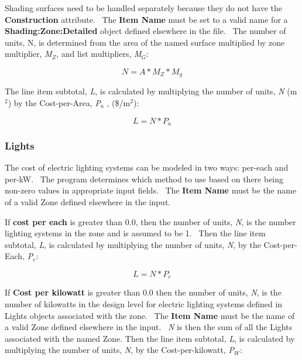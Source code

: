 Shading surfaces need to be handled separately because they do not have the \textbf{Construction} attribute.~ The \textbf{Item Name} must be set to a valid name for a \textbf{Shading:Zone:Detailed} object defined elsewhere in the file.~ The number of units, N, is determined from the area of the named surface multiplied by zone multiplier, \emph{M\(_{Z}\)}, and list multipliers, \emph{M\(_{G}\)}:

\begin{equation}
N = A*{M_Z} * {M_g}
\end{equation}

The line item subtotal, \emph{L}, is calculated by multiplying the number of units, \emph{N} (m\(^{2}\)) by the Cost-per-Area, \emph{P\(_{a}\)} , (\$/m\(^{2}\)):

\begin{equation}
L = N * {P_a}
\end{equation}

\subsubsection{Lights}\label{lights}

The cost of electric lighting systems can be modeled in two ways: per-each and per-kW.~ The program determines which method to use based on there being non-zero values in appropriate input fields.~ The \textbf{Item Name} must be the name of a valid Zone defined elsewhere in the input.

If \textbf{cost per each} is greater than 0.0, then the number of units, \emph{N}, is the number lighting systems in the zone and is assumed to be 1.~ Then the line item subtotal, \emph{L}, is calculated by multiplying the number of units, \emph{N}, by the Cost-per-Each, \emph{P\(_{e}\)}:

\begin{equation}
L = N * {P_e}
\end{equation}

If \textbf{Cost per kilowatt} is greater than 0.0 then the number of units, \emph{N}, is the number of kilowatts in the design level for electric lighting systems defined in Lights objects associated with the zone.~ The \textbf{Item Name} must be the name of a valid Zone defined elsewhere in the input.~ \emph{N} is then the sum of all the Lights associated with the named Zone. Then the line item subtotal, \emph{L}, is calculated by multiplying the number of units, \emph{N}, by the Cost-per-kilowatt, \emph{P\(_{W}\)}:

